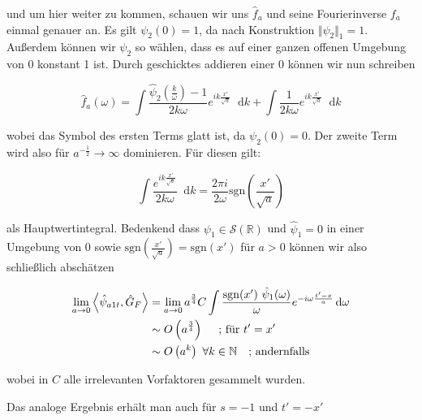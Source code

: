 \documentclass{scrartcl}
\renewcommand*\d{\mathop{}\!\mathrm{d}}
\begin{document}
und um hier weiter zu kommen, schauen wir uns $\hat f_a$ und seine Fourierinverse
$f_a$ einmal genauer an. Es gilt $\psi_2(0) = 1$, da nach Konstruktion
$\Vert \psi_2 \Vert_1 = 1$. Außerdem können wir $\psi_2$ so wählen, dass es
auf einer ganzen offenen Umgebung von 0 konstant 1 ist. Durch geschicktes addieren
einer 0 können wir nun schreiben

\begin{equation*}
    \hat f_a (\omega) =
    \int \frac{\hat \psi_2 \left(\frac{k}{\omega}\right) - 1}{2k\omega}
    e^{ik\frac{x'}{\sqrt{a}}} \d k
    + \int \frac{1}{2k\omega}
    e^{ik\frac{x'}{\sqrt{a}}} \d k
\end{equation*}

wobei das Symbol des ersten Terms glatt ist, da $\psi_2 (0) = 0$. Der zweite Term
wird also für $a^{-\frac{1}{2}} \rightarrow \infty$ dominieren. Für diesen gilt:

\begin{equation*}
    \int \frac{e^{ik\frac{x'}{\sqrt{a}}}}{2k\omega} \d k
    = \frac{2 \pi i}{2 \omega} \mathrm{sgn}\left(\frac{x'}{\sqrt{a}}\right)
\end{equation*}

als Hauptwertintegral. Bedenkend dass $\psi_1 \in \mathcal{S} (\mathbb{R})$ und
$\hat \psi_1 = 0$ in einer Umgebung von $0$ sowie
$\mathrm{sgn}\left(\frac{x'}{\sqrt{a}}\right) = \mathrm{sgn}\left(x'\right)$  für $a>0$
können wir also schließlich abschätzen

\begin{align}
    \lim_{a \rightarrow 0}\left< \hat\psi_{a1t}, \hat G_F \right>
    &= \lim_{a \rightarrow 0} a^\frac{3}{4} C \int \frac{\mathrm{sgn}(x')
    ~\hat \psi_1(\omega)}{\omega}
    e^{-i\omega \frac{t'-x}{a}} \d \omega
    \nonumber \\
    &\sim O\left(a^\frac{3}{4}\right) \kern 1em \textrm{ ; für } t'=x'
    \nonumber \\
    &\sim O\left(a^k\right) ~ \forall k \in \mathbb{N} \kern 1em \textrm{;   andernfalls}
\end{align}

wobei in $C$ alle irrelevanten Vorfaktoren gesammelt wurden.

Das analoge Ergebnis erhält man auch für $s=-1$ und $t' = -x'$



\printbibliography
\end{document}
